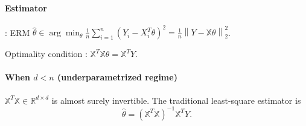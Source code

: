 \paragraph{Estimator}: ERM $ \hat{\theta } \in \arg \min _\theta \frac{1}{n} \sum_{i=1}^{n} (Y_i - X_i^T \theta )^2 = \frac{1}{n} \left\| Y - \mathbb{X}\theta  \right\| _2 ^2 $.

Optimality condition : $\mathbb{X}^T \mathbb{X} \theta = \mathbb{X}^T Y$. 

\paragraph[]{When $d<n$ (underparametrized regime)} $\mathbb{X}^T \mathbb{X} \in  \mathbb{R}^{d \times d}$ is almost surely invertible. The traditional least-square estimator is 
\[
    \hat{\theta } = (\mathbb{X}^T \mathbb{X})^{-1} \mathbb{X}^T Y
.\]


